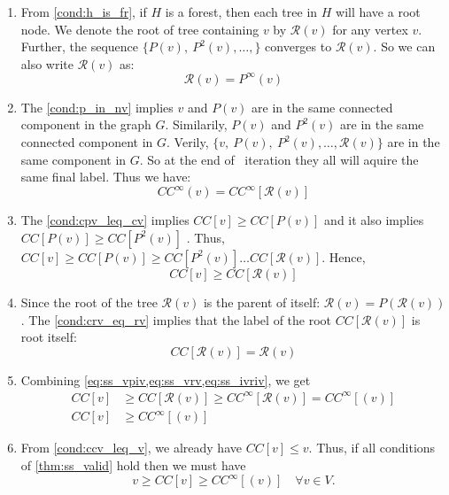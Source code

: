 \begin{enumerate}

\item From \cref{cond:h_is_fr}, if $H$ is a forest, then each tree in $H$ 
will have a root node.  We denote the root of tree containing $v$ by $\mathcal
{R}(v)$  for any vertex $v$. Further, the sequence 
$\{ P(v),\  P^{2}(v), \ldots, \}  $  converges to $\mathcal{R}(v)$. So we can 
also write $\mathcal{R}(v)$ as:
\begin{equation}
\label{eq:ss_vpiv}
 \mathcal{R}(v) = P^{\infty}(v)
\end{equation}

\item The \cref{cond:p_in_nv} implies $v$ and $P(v)$ are in the same connected component in the graph $G$.  Similarily, $P(v)$ and $P^{2}(v)$ are in the same connected component in $G$.  Verily,  $\{ v,\  P(v),\  P^{2}(v), \ldots,  \mathcal{R}(v) \}  $
are in the same component in $G$.  So at the end of \sv~iteration they all will aquire the same final label. Thus we have:
\begin{equation}
\label{eq:ss_ivriv}
CC^\infty(v) = CC^{\infty}[{\mathcal{R}}(v)]
\end{equation} 

\item The \cref{cond:cpv_leq_cv} implies $ CC[v] \geq CC[P(v)] $  and it also 
implies $CC[P(v)]\geq CC[P^{2}(v)]$ .  Thus, 
$CC[v] \geq CC[P(v)]\geq CC[P^{2}(v)] \ldots CC[ \mathcal{R}(v)]$. Hence, 
%
\begin{equation}
\label{eq:ss_vrv}
CC[v] \geq CC[ \mathcal{R}(v)]
\end{equation} 



\item Since the root of the tree $\mathcal{R}(v)$ is the parent of itself: $ \mathcal{R}(v) = P(\mathcal{R}(v))$. The \cref{cond:crv_eq_rv} implies that the label of the root $CC[ \mathcal{R}(v)]$ is root itself:
\begin{equation}
CC[ \mathcal{R}(v)] = \mathcal{R}(v) 
\end{equation} 

\item Combining \cref{eq:ss_vpiv,eq:ss_vrv,eq:ss_ivriv}, we get 
\begin{align}
\label{eq:ss_vhs}
CC[v] & \geq   CC[ \mathcal{R}(v)] \geq CC^{\infty}[ \mathcal{R}(v)]  = CC^{\infty}[ (v)]  \\
CC[v] & \geq  CC^{\infty}[ (v)]
\end{align}

\item From \cref{cond:ccv_leq_v}, we already have $CC[v]\leq v$. Thus, if all conditions of \cref{thm:ss_valid} hold then
we must have 
\begin{equation}
\label{eq:ss_prf}
v \geq CC[v]  \geq  CC^{\infty}[ (v)] \quad \forall v \in V.
\end{equation}
\end{enumerate}

